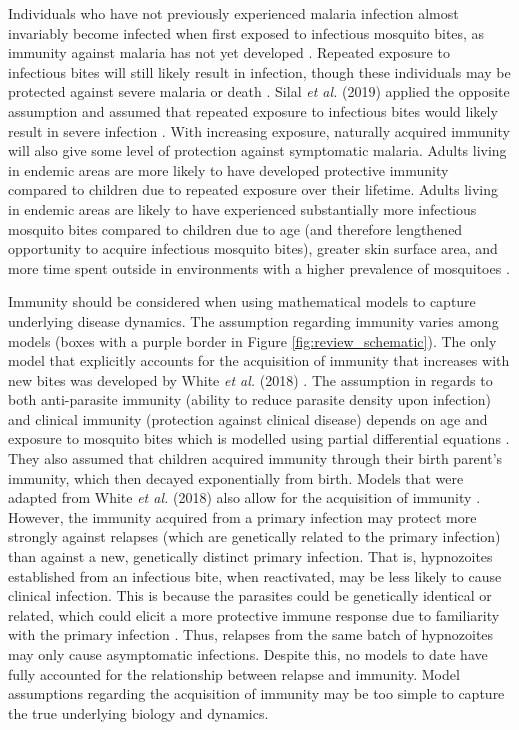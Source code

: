 \documentclass[12pt]{article}
\newcommand{\etal}{\textit{et al. }}
\begin{document}
Individuals who have not previously experienced malaria infection almost invariably become infected when first exposed to infectious mosquito bites, as immunity against malaria has not yet developed \cite{langhorne2008immunity}. Repeated exposure to infectious bites will still likely result in infection, though these individuals may be protected against severe malaria or death \cite{langhorne2008immunity}. Silal \etal(2019) \cite{silal2019malaria} applied the opposite assumption and assumed that repeated exposure to infectious bites would likely result in severe infection \cite{silal2019malaria}. With increasing exposure, naturally acquired immunity will also give some level of protection against symptomatic malaria. Adults living in endemic areas are more likely to have developed protective immunity compared to children due to repeated exposure over their lifetime. Adults living in endemic areas are likely to have experienced substantially more infectious mosquito bites compared to children due to age (and therefore lengthened opportunity to acquire infectious mosquito bites), greater skin surface area, and more time spent outside in environments with a higher prevalence of mosquitoes \cite{port1980relationship,carnevale1978aggressiveness,white2018mathematical}. 

Immunity should be considered when using mathematical models to capture underlying disease dynamics. The assumption regarding immunity varies among models (boxes with a purple border in Figure \ref{fig:review_schematic}). The only model that explicitly accounts for the acquisition of immunity that increases with new bites was developed by White \etal (2018) \cite{white2018mathematical}. The assumption in regards to both anti-parasite immunity (ability to reduce parasite density upon infection) and clinical immunity (protection against clinical disease) depends on age and exposure to mosquito bites which is modelled using partial differential equations \cite{white2018mathematical}. They also assumed that children acquired immunity through their birth parent's immunity, which then decayed exponentially from birth. Models that were adapted from White \etal(2018) \cite{white2018mathematical} also allow for the acquisition of immunity \cite{huber2021radical,nekkab2021estimated,white2022potential,obadia2022developing}. However, the immunity acquired from a primary infection may protect more strongly against relapses (which are genetically related to the primary infection) than against a new, genetically distinct primary infection. That is, hypnozoites established from an infectious bite, when reactivated, may be less likely to cause clinical infection. This is because the parasites could be genetically identical or related, which could elicit a more protective immune response due to familiarity with the primary infection \cite{white2011determinants,joyner2019humoral}. Thus, relapses from the same batch of hypnozoites may only cause asymptomatic infections. Despite this, no models to date have fully accounted for the relationship between relapse and immunity. Model assumptions regarding the acquisition of immunity may be too simple to capture the true underlying biology and dynamics.
\end{document}
